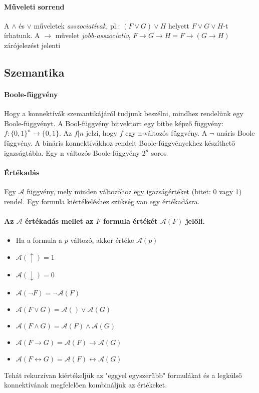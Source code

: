 \documentclass[10pt,a4paper]{article}
\begin{document}
\paragraph{Műveleti sorrend}
A $\wedge$ és $\vee$ műveletek \textit{asszociatívak}, pl.: $(F \vee G) \vee H$ helyett $F \vee G \vee H$-t írhatunk. A $\rightarrow$ művelet \textit{jobb-asszociatív}, $F \rightarrow G \rightarrow H = F \rightarrow ( G \rightarrow H)$ zárójelezést jelenti
\subsection{Szemantika}
\paragraph{Boole-függvény}
Hogy a konnektívák szemantikájáról tudjunk beszélni, mindhez rendelünk egy Boole-függvényt. A Bool-függvény bitvektort egy bitbe képző függvény: $f: \{0,1\}^{n} \rightarrow \{0,1\}.$ \newline
Az $f|n$ jelzi, hogy $f$ egy n-változós függvény. A $\neg$ unáris Boole függvény. A bináris konnektívákhoz rendelt Boole-függvényekhez készíthető igazságtábla. Egy n változós  Boole-függvény $2^{n}$ soros
\paragraph{Értékadás}
Egy $\mathcal{A}$ függvény, mely minden változóhoz egy igazságértéket (bitet: 0 vagy 1) rendel. Egy formula kiértékeléshez szükség van egy értékadásra. \newline
\paragraph{Az $\mathcal{A}$ értékadás mellet az $F$ formula értékét $\mathcal{A}(F)$ jelöli.}
\begin{itemize}
\item Ha a formula a $p$ változó, akkor értéke $\mathcal{A}(p)$
\item $\mathcal{A}(\uparrow) = 1$
\item $\mathcal{A}(\downarrow) = 0$
\item $\mathcal{A}(\neg F) = \neg \mathcal{A}(F)$
\item $\mathcal{A}(F \vee G) = \mathcal{A}() \vee \mathcal{A}(G)$
\item $\mathcal{A}(F \wedge G) = \mathcal{A}(F) \wedge \mathcal{A}(G)$
\item $\mathcal{A}(F \rightarrow G) = \mathcal{A}(F) \rightarrow \mathcal{A}(G)$
\item $\mathcal{A}(F \leftrightarrow G) = \mathcal{A}(F) \leftrightarrow \mathcal{A}(G)$
\end{itemize}
Tehát rekurzívan kiértékeljük az "eggyel egyszerűbb" formulákat és a legkülső konnektívának megfelelően kombináljuk az értékeket.
\end{document}
